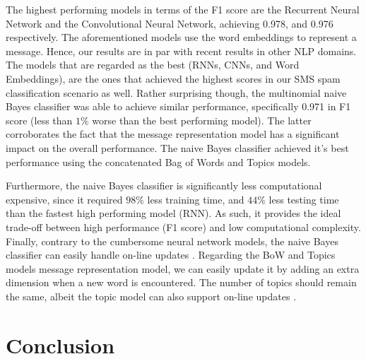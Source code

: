 \documentclass[letterpaper]{article}
\begin{document}
The highest performing models in terms of the F1 score are the Recurrent Neural Network and the Convolutional Neural Network, achieving 0.978, and 0.976 respectively. The aforementioned models use the word embeddings to represent a message. Hence, our results are in par with recent results in other NLP domains. The models that are regarded as the best (RNNs, CNNs, and Word Embeddings), are the ones that achieved the highest scores in our SMS spam classification scenario as well. Rather surprising though, the multinomial naive Bayes classifier was able to achieve similar performance, specifically 0.971 in F1 score (less than $1\%$ worse than the best performing model). The latter corroborates the fact that the message representation model has a significant impact on the overall performance. The naive Bayes classifier achieved it's best performance using the concatenated Bag of Words and Topics models.

Furthermore, the naive Bayes classifier is significantly less computational expensive, since it required $98\%$ less training time, and $44\%$ less testing time than the fastest high performing model (RNN). As such, it provides the ideal trade-off between high performance (F1 score) and low computational complexity. Finally, contrary to the cumbersome neural network models, the naive Bayes classifier can easily handle on-line updates \cite{chan1982updating}. Regarding the BoW and Topics models message representation model, we can easily update it by adding an extra dimension when a new word is encountered. The number of topics should remain the same, albeit the topic model can also support on-line updates \cite{canini2009online}.

\section{Conclusion} \label{Conclusion}
\end{document}
